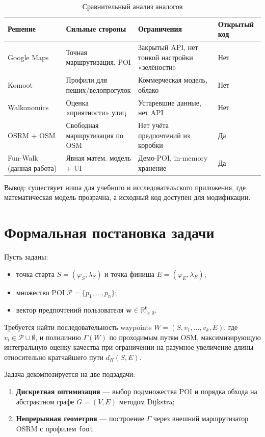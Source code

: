\begin{table}[H]
\centering
\caption{Сравнительный анализ аналогов}
\label{tab:analogs}
\begin{tabular}{@{}p{3.2cm}p{4.5cm}p{4.5cm}p{3.5cm}@{}}
\toprule
\textbf{Решение} & \textbf{Сильные стороны} & \textbf{Ограничения} & \textbf{Открытый код} \\
\midrule
Google Maps & Точная маршрутизация, POI & Закрытый API, нет тонкой настройки «зелёности» & Нет \\
Komoot & Профили для пеших/велопрогулок & Коммерческая модель, облако & Нет \\
Walkonomics & Оценка «приятности» улиц & Устаревшие данные, нет API & Нет \\
OSRM + OSM & Свободная маршрутизация по OSM & Нет учёта предпочтений из коробки & Да \\
Fun-Walk (данная работа) & Явная матем. модель + UI & Демо-POI, in-memory хранение & Да \\
\bottomrule
\end{tabular}
\end{table}

Вывод: существует ниша для учебного и исследовательского приложения, где
математическая модель прозрачна, а исходный код доступен для модификации.

\section{Формальная постановка задачи}

Пусть заданы:
\begin{itemize}
  \item точка старта $S = (\varphi_S, \lambda_S)$ и точка финиша $E = (\varphi_E, \lambda_E)$;
  \item множество POI $\mathcal{P} = \{p_1, \ldots, p_n\}$;
  \item вектор предпочтений пользователя $\mathbf{w} \in \mathbb{R}^6_{\geq 0}$.
\end{itemize}

Требуется найти последовательность waypoints $W = (S, v_1, \ldots, v_k, E)$, где
$v_i \in \mathcal{P} \cup \emptyset$, и полилинию $\Gamma(W)$ по проходимым путям OSM,
максимизирующую интегральную оценку качества при ограничении на разумное
увеличение длины относительно кратчайшего пути $d_H(S, E)$.

Задача декомпозируется на две подзадачи:
\begin{enumerate}
  \item \textbf{Дискретная оптимизация} --- выбор подмножества POI и порядка обхода
        на абстрактном графе $G = (V, E)$ методом Dijkstra;
  \item \textbf{Непрерывная геометрия} --- построение $\Gamma$ через внешний
        маршрутизатор OSRM с профилем \texttt{foot}.
\end{enumerate}

